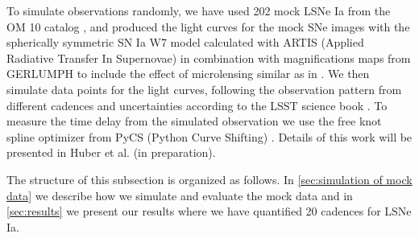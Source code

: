 To simulate observations randomly, we have used 202
mock LSNe Ia from the OM 10 catalog \citep{Oguri:2010},
and produced the light curves for the mock SNe images with
the spherically symmetric SN Ia W7 model \citep{1984:Nomoto}
calculated with ARTIS (Applied Radiative Transfer In Supernovae)
\citep{Kromer:2009ce} in combination with magnifications maps from
GERLUMPH \citep{Vernardos:2015wta} to include the effect of
microlensing similar as in \citep{Goldstein:2017bny}. We then simulate
data points for the light curves, following the observation pattern from different cadences
and uncertainties according to the LSST science book
\citep{2009:LSSTscience}. To measure the time delay from the simulated
observation we use the free knot spline optimizer from PyCS (Python
Curve Shifting) \citep{2013:Tewesb,Bonvin:2015jia}. Details of this
work will be presented in Huber et al. (in preparation).


The structure of this subsection is organized as follows. In
\ref{sec:simulation of mock data} we describe how we simulate and
evaluate the mock data and in \ref{sec:results} we present our results
where we have quantified 20 cadences for LSNe Ia.

